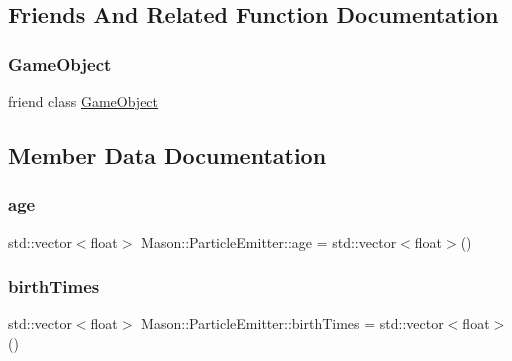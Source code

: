 \subsection{Friends And Related Function Documentation}
\hypertarget{class_mason_1_1_particle_emitter_a00df87c957d8f7ee0fc51f07a0542f4a}{}\label{class_mason_1_1_particle_emitter_a00df87c957d8f7ee0fc51f07a0542f4a} 
\subsubsection{\texorpdfstring{Game\+Object}{GameObject}}
{\footnotesize\ttfamily friend class \hyperlink{class_mason_1_1_game_object}{Game\+Object}\hspace{0.3cm}{\ttfamily [friend]}}



\subsection{Member Data Documentation}
\hypertarget{class_mason_1_1_particle_emitter_af8aa10f22ae7a4662b198d52c2424d3c}{}\label{class_mason_1_1_particle_emitter_af8aa10f22ae7a4662b198d52c2424d3c} 
\subsubsection{\texorpdfstring{age}{age}}
{\footnotesize\ttfamily std\+::vector$<$float$>$ Mason\+::\+Particle\+Emitter\+::age = std\+::vector$<$float$>$()\hspace{0.3cm}{\ttfamily [protected]}}

\hypertarget{class_mason_1_1_particle_emitter_aa7e4b79447b8c65255b92d313464a03c}{}\label{class_mason_1_1_particle_emitter_aa7e4b79447b8c65255b92d313464a03c} 
\subsubsection{\texorpdfstring{birth\+Times}{birthTimes}}
{\footnotesize\ttfamily std\+::vector$<$float$>$ Mason\+::\+Particle\+Emitter\+::birth\+Times = std\+::vector$<$float$>$()\hspace{0.3cm}{\ttfamily [protected]}}

